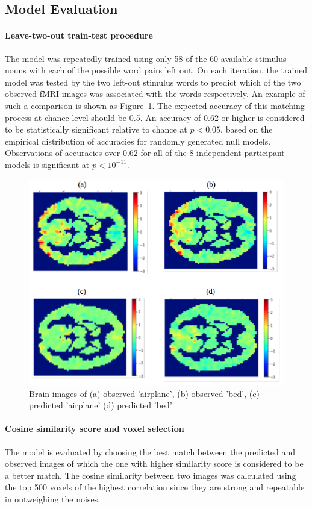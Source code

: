 \documentclass{article}
\begin{document}
\subsection{Model Evaluation}
\paragraph{Leave-two-out train-test procedure} The model was repeatedly trained using only 58 of the 60 available stimulus nouns with each of the possible word pairs left out. On each iteration, the trained model was tested by
the two left-out stimulus words to predict which of the two observed fMRI images was associated with the words respectively. An example of such a comparison is shown as Figure~\ref{brain}. The expected accuracy of this matching process at chance level should be 0.5. An accuracy of 0.62 or higher is considered to be statistically significant relative to chance at $p<0.05$, based on the empirical distribution of accuracies for randomly generated null models. Observations of accuracies over 0.62 for all of the 8 independent participant models is significant at $p<10^{-11}$. 

\begin{figure}
\centering
\includegraphics[scale=0.4]{brain.png}
\caption{Brain images of (a) observed 'airplane', (b) observed 'bed', (c) predicted 'airplane' (d) predicted 'bed'}
\label{brain}
\end{figure}



\paragraph{Cosine similarity score and voxel selection}
The model is evaluated by choosing the best match between the predicted and observed images of which the one with higher similarity score is considered to be a better match. The cosine similarity between two images was calculated using the top 500 voxels of the highest correlation since they are strong and repeatable in outweighing the noises. 
\end{document}
